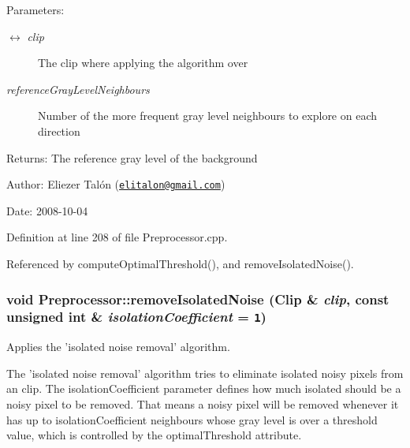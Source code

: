 \begin{Desc}
\item[Parameters:]
\begin{description}
\item[\mbox{$\leftrightarrow$} {\em clip}]The clip where applying the algorithm over \item[{\em referenceGrayLevelNeighbours}]Number of the more frequent gray level neighbours to explore on each direction\end{description}
\end{Desc}
\begin{Desc}
\item[Returns:]The reference gray level of the background\end{Desc}
\begin{Desc}
\item[Author:]Eliezer Talón (\href{mailto:elitalon@gmail.com}{\tt elitalon@gmail.com}) \end{Desc}
\begin{Desc}
\item[Date:]2008-10-04 \end{Desc}


Definition at line 208 of file Preprocessor.cpp.

Referenced by computeOptimalThreshold(), and removeIsolatedNoise().\hypertarget{class_preprocessor_a365f69af48cae608071e9943f300dd5}{
\subsubsection[removeIsolatedNoise]{\setlength{\rightskip}{0pt plus 5cm}void Preprocessor::removeIsolatedNoise ({\bf Clip} \& {\em clip}, \/  const unsigned int \& {\em isolationCoefficient} = {\tt 1})}}
\label{class_preprocessor_a365f69af48cae608071e9943f300dd5}


Applies the 'isolated noise removal' algorithm. 

The 'isolated noise removal' algorithm tries to eliminate isolated noisy pixels from an clip. The isolationCoefficient parameter defines how much isolated should be a noisy pixel to be removed. That means a noisy pixel will be removed whenever it has up to isolationCoefficient neighbours whose gray level is over a threshold value, which is controlled by the optimalThreshold attribute.

